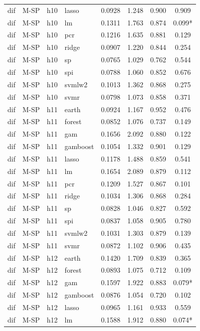 \begin{ThreePartTable}
\begin{longtable}[t]{llclcccc}
dif & M-SP & h10 & lasso & 0.0928 & 1.248 & 0.900 & 0.909\\
dif & M-SP & h10 & lm & 0.1311 & 1.763 & 0.874 & 0.099*\\
dif & M-SP & h10 & pcr & 0.1216 & 1.635 & 0.881 & 0.129\\
dif & M-SP & h10 & ridge & 0.0907 & 1.220 & 0.844 & 0.254\\
dif & M-SP & h10 & sp & 0.0765 & 1.029 & 0.762 & 0.544\\
dif & M-SP & h10 & spi & 0.0788 & 1.060 & 0.852 & 0.676\\
dif & M-SP & h10 & svmlw2 & 0.1013 & 1.362 & 0.868 & 0.275\\
dif & M-SP & h10 & svmr & 0.0798 & 1.073 & 0.858 & 0.371\\
\addlinespace
dif & M-SP & h11 & earth & 0.0924 & 1.167 & 0.952 & 0.476\\
dif & M-SP & h11 & forest & 0.0852 & 1.076 & 0.737 & 0.149\\
dif & M-SP & h11 & gam & 0.1656 & 2.092 & 0.880 & 0.122\\
dif & M-SP & h11 & gamboost & 0.1054 & 1.332 & 0.901 & 0.129\\
dif & M-SP & h11 & lasso & 0.1178 & 1.488 & 0.859 & 0.541\\
dif & M-SP & h11 & lm & 0.1654 & 2.089 & 0.879 & 0.112\\
dif & M-SP & h11 & pcr & 0.1209 & 1.527 & 0.867 & 0.101\\
dif & M-SP & h11 & ridge & 0.1034 & 1.306 & 0.868 & 0.284\\
dif & M-SP & h11 & sp & 0.0828 & 1.046 & 0.827 & 0.592\\
dif & M-SP & h11 & spi & 0.0837 & 1.058 & 0.905 & 0.780\\
dif & M-SP & h11 & svmlw2 & 0.1031 & 1.303 & 0.879 & 0.139\\
dif & M-SP & h11 & svmr & 0.0872 & 1.102 & 0.906 & 0.435\\
\addlinespace
dif & M-SP & h12 & earth & 0.1420 & 1.709 & 0.839 & 0.365\\
dif & M-SP & h12 & forest & 0.0893 & 1.075 & 0.712 & 0.109\\
dif & M-SP & h12 & gam & 0.1597 & 1.922 & 0.883 & 0.079*\\
dif & M-SP & h12 & gamboost & 0.0876 & 1.054 & 0.720 & 0.102\\
dif & M-SP & h12 & lasso & 0.0965 & 1.161 & 0.933 & 0.559\\
dif & M-SP & h12 & lm & 0.1588 & 1.912 & 0.880 & 0.074*\\

\end{longtable}
\end{ThreePartTable}
